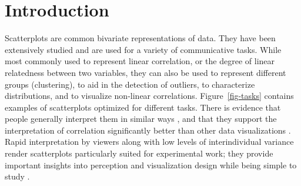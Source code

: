 \documentclass[manuscript, anonymous, screen]{acmart}
\begin{document}


\maketitle

\setlength{\parskip}{-0.1pt}

\hypertarget{introduction}{%
\section{Introduction}\label{introduction}}

Scatterplots are common bivariate representations of data. They have
been extensively studied and are used for a variety of communicative
tasks. While most commonly used to represent linear correlation, or the
degree of linear relatedness between two variables, they can also be
used to represent different groups (clustering), to aid in the detection
of outliers, to characterize distributions, and to visualize non-linear
correlations. Figure~\ref{fig-tasks} contains examples of scatterplots
optimized for different tasks. There is evidence that people generally
interpret them in similar ways \citep{kay_2015}, and that they support
the interpretation of correlation significantly better than other data
visualizations \citep{li_2010}. Rapid interpretation by viewers
\citep{rensink_2014} along with low levels of interindividual variance
render scatterplots particularly suited for experimental work; they
provide important insights into perception and visualization design
while being simple to study \citep{rensink_2014}.
\end{document}
